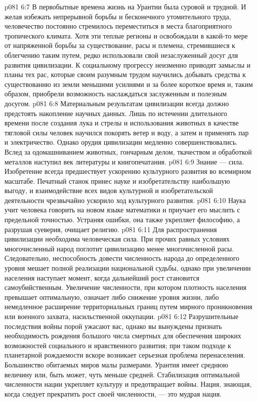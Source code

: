 \vs p081 6:7 В первобытные времена жизнь на Урантии была суровой и трудной. И желая избежать непрерывной борьбы и бесконечного утомительного труда, человечество постоянно стремилось переместиться в места благоприятного тропического климата. Хотя эти теплые регионы и освобождали в какой\hyp{}то мере от напряженной борьбы за существование, расы и племена, стремившиеся к облегчению таким путем, редко использовали свой незаслуженный досуг для развития цивилизации. К социальному прогрессу неизменно приводят замыслы и планы тех рас, которые своим разумным трудом научились добывать средства к существованию из земли меньшими усилиями и за более короткое время и, таким образом, приобрели возможность наслаждаться заслуженным и полезным досугом.
\vs p081 6:8 \bibnobreakspace {} Материальным результатам цивилизации всегда должно предстоять накопление научных данных. Лишь по истечении длительного времени после создания лука и стрелы и использования животных в качестве тягловой силы человек научился покорять ветер и воду, а затем и применять пар и электричество. Однако орудия цивилизации медленно совершенствовались. Вслед за одомашниванием животных, гончарным делом, ткачеством и обработкой металлов наступил век литературы и книгопечатания.
\vs p081 6:9 Знание --- сила. Изобретение всегда предшествует ускорению культурного развития во всемирном масштабе. Печатный станок принес науке и изобретательству наибольшую выгоду, и взаимодействие всех видов культурной и изобретательской деятельности чрезвычайно ускорило ход культурного развития.
\vs p081 6:10 Наука учит человека говорить на новом языке математики и приучает его мыслить с предельной точностью. Устраняя ошибки, она также укрепляет философию, а разрушая суеверия, очищает религию.
\vs p081 6:11 \bibnobreakspace {} Для распространения цивилизации необходима человеческая сила. При прочих равных условиях многочисленный народ поглотит цивилизацию менее многочисленной расы. Следовательно, неспособность довести численность народа до определенного уровня мешает полной реализации национальной судьбы, однако при увеличении населения наступает момент, когда дальнейший рост становится самоубийственным. Увеличение численности, при котором плотность населения превышает оптимальную, означает либо снижение уровня жизни, либо немедленное расширение территориальных границ путем мирного проникновения или военного захвата, насильственной оккупации.
\vs p081 6:12 Разрушительные последствия войны порой ужасают вас, однако вы вынуждены признать необходимость рождения большого числа смертных для обеспечения широких возможностей социального и нравственного развития; при таком подходе к планетарной рождаемости вскоре возникает серьезная проблема перенаселения. Большинство обитаемых миров малы размерами. Урантия имеет среднюю величину или, быть может, чуть меньше средней. Стабилизация оптимальной численности нации укрепляет культуру и предотвращает войны. Нация, знающая, когда следует прекратить рост своей численности, --- это мудрая нация.
